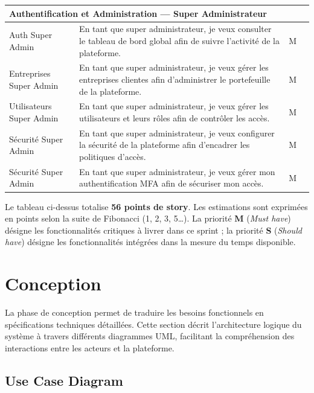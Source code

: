 \begin{small}
\begin{longtable}{|p{2.5cm}|p{6.8cm}|>{\centering\arraybackslash}p{2.2cm}|>{\centering\arraybackslash}p{2.2cm}|}
\multicolumn{4}{|l|}{\cellcolor[HTML]{F2F2F2}\textbf{Authentification et Administration — Super Administrateur}} \\ \hline
Auth Super Admin & En tant que super administrateur, je veux consulter le tableau de bord global afin de suivre l'activité de la plateforme. & M & 3 \\ \hline
Entreprises Super Admin & En tant que super administrateur, je veux gérer les entreprises clientes afin d'administrer le portefeuille de la plateforme. & M & 5 \\ \hline
Utilisateurs Super Admin & En tant que super administrateur, je veux gérer les utilisateurs et leurs rôles afin de contrôler les accès. & M & 5 \\ \hline
Sécurité Super Admin & En tant que super administrateur, je veux configurer la sécurité de la plateforme afin d'encadrer les politiques d'accès. & M & 3 \\ \hline
Sécurité Super Admin & En tant que super administrateur, je veux gérer mon authentification MFA afin de sécuriser mon accès. & M & 3 \\ \hline

\end{longtable}
\end{small}
\renewcommand{\arraystretch}{1}

\noindent Le tableau ci-dessus totalise \textbf{56 points de story}. Les estimations sont exprimées en points selon la suite de Fibonacci (1, 2, 3, 5…). La priorité \textbf{M} (\textit{Must have}) désigne les fonctionnalités critiques à livrer dans ce sprint ; la priorité \textbf{S} (\textit{Should have}) désigne les fonctionnalités intégrées dans la mesure du temps disponible.

\section{Conception}
La phase de conception permet de traduire les besoins fonctionnels en spécifications techniques détaillées. Cette section décrit l'architecture logique du système à travers différents diagrammes UML, facilitant la compréhension des interactions entre les acteurs et la plateforme.

\subsection{Use Case Diagram}

